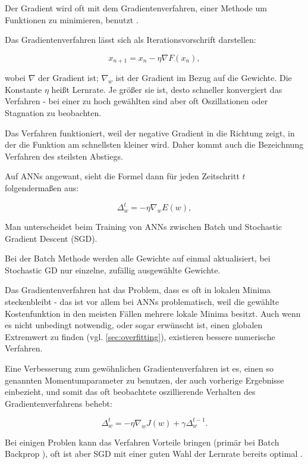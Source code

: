 Der Gradient wird oft mit dem Gradientenverfahren, einer Methode um Funktionen zu minimieren, benutzt \cite{bishop1995neural,bengio2012practical} 
.

Das Gradientenverfahren lässt sich als Iterationsvorschrift darstellen:

\begin{equation}
x_{n+1}=x_n- \eta  \nabla F(x_n), 
\end{equation}

wobei $\nabla$ der Gradient ist; $\nabla_w$ ist der Gradient im Bezug auf die Gewichte. 
Die Konstante $\eta$ heißt Lernrate. Je größer sie ist, desto schneller konvergiert das Verfahren - bei einer zu hoch gewählten sind aber oft Oszillationen oder Stagnation zu beobachten. 

Das Verfahren funktioniert, weil der negative Gradient in die Richtung zeigt, in der die Funktion am schnellsten kleiner wird. Daher kommt auch die Bezeichnung Verfahren des steilsten Abstiegs.

Auf ANNs angewant, sieht die Formel dann für jeden Zeitschritt $t$ folgendermaßen aus:

\begin{equation}
  \Delta_w^t = - \eta  \nabla_w E(w),
\end{equation}





Man unterscheidet beim Training von ANNs zwischen Batch und Stochastic Gradient Descent (SGD).

Bei der Batch Methode werden alle Gewichte auf einmal aktualisiert, bei Stochastic GD nur einzelne, zufällig ausgewählte Gewichte.

Das Gradientenverfahren hat das Problem, dass es oft in lokalen Minima steckenbleibt - das ist vor allem bei ANNs problematisch, weil die gewählte Kostenfunktion in den meisten Fällen mehrere lokale Minima besitzt. Auch wenn es nicht unbedingt notwendig, oder sogar erwünscht ist, einen globalen Extremwert zu finden (vgl. \ref{sec:overfitting}), existieren bessere numerische Verfahren. 

Eine Verbesserung zum gewöhnlichen Gradientenverfahren ist es, einen so genannten Momentumparameter zu benutzen, der auch vorherige Ergebnisse einbezieht, und somit das oft beobachtete oszillierende Verhalten des Gradientenverfahrens behebt:

\begin{equation}
 \Delta_w^t = - \eta  \nabla_w J(w) + \gamma \Delta_w^{t-1}.
\end{equation}

Bei einigen Problen kann das Verfahren Vorteile bringen (primär bei Batch Backprop \cite{lecunefficient}), oft ist aber SGD mit einer guten Wahl der Lernrate bereits optimal \cite{bengio2012practical}.
